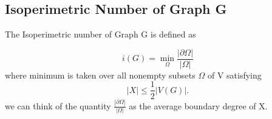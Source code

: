 \documentclass[oneside]{book}
\begin{document}
		

	
	
	

	
	



	
	
	
	\subsection{Isoperimetric Number of Graph G} \label{ss:23}
	
	
       	The Isoperimetric number of Graph G is defined as \par
    	$$
		i(G)=\min _{\Omega} \frac{|\partial \Omega|}{|\Omega|}
$$
	where minimum is taken over all nonempty subsets $\Omega$ of V satisfying  $$|X| \leq \frac{1}{2}|V(G)|.$$
	 we can think of the quantity  \(\frac{|\partial \Omega|}{|\Omega|}\)  as the average boundary degree of X. 
	
\end{document}
